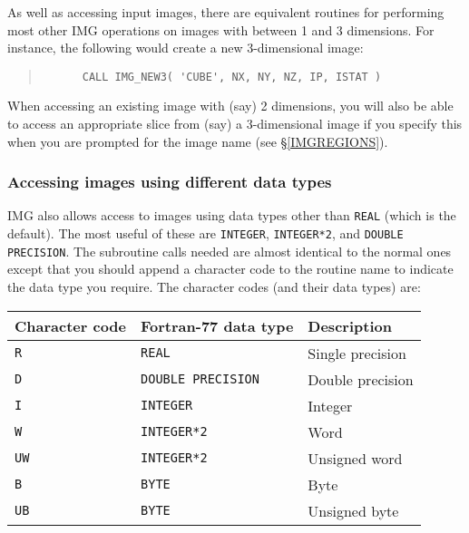 \documentclass[twoside,11pt]{article}
\newcommand{\hyperref}[4]{#2\ref{#4}#3}
\renewcommand{\_}{\texttt{\symbol{95}}}
\newcommand{\myverb}[1]{{\texttt{#1}}}
\newenvironment{code}{\begin{small} \begin{quote}}
                     {\end{quote} \end{small}}
\begin{document}
As well as accessing input images, there are equivalent routines for
performing most other IMG operations on images with between 1 and 3
dimensions. For instance, the following would create a new
3-dimensional image:
\begin{code}
\begin{verbatim}
      CALL IMG_NEW3( 'CUBE', NX, NY, NZ, IP, ISTAT )
\end{verbatim}
\end{code}

When accessing an existing image with (say) 2 dimensions, you will
also be able to access an appropriate slice from (say) a 3-dimensional
image if you specify this when you are prompted for the image name
(see \hyperref{elsewhere}{\S}{}{IMGREGIONS}).

\subsubsection{Accessing \label{IMGDIFFERENTDATATYPES} images using different data types}
IMG also allows access to images using data types other than
\myverb{REAL} (which is the default). The most useful of these are
\myverb{INTEGER}, \myverb{INTEGER*2}, and \myverb{DOUBLE
PRECISION}. The subroutine calls needed are almost identical to the
normal ones except that you should append a character code to the
routine name to indicate the data type you require.  The character
codes (and their data types) are:
\begin{small}
\begin{center}
\begin{tabular}{||l|l|l||}
\hline
Character code & Fortran-77 data type      &  Description      \\
\hline
 \myverb{R}    & \myverb{REAL}             &  Single precision \\
 \myverb{D}    & \myverb{DOUBLE PRECISION} &  Double precision \\
 \myverb{I}    & \myverb{INTEGER}          &  Integer          \\
\hline
  \myverb{W}   & \myverb{INTEGER*2}        &  Word             \\
  \myverb{UW}  & \myverb{INTEGER*2}        &  Unsigned word    \\
  \myverb{B}   & \myverb{BYTE}             &  Byte             \\
  \myverb{UB}  & \myverb{BYTE}             &  Unsigned byte    \\
\hline
\end{tabular}
\end{center}
\end{small}
\end{document}
